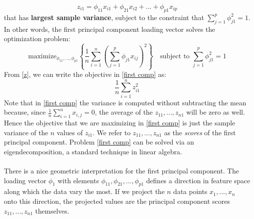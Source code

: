 \begin{equation}
    z_{i1} = \phi_{11}x_{i1} + \phi_{21}x_{i2} + ... +\phi_{p1}x_{ip}
    \label{z}
\end{equation}
that has \textbf{largest sample variance}, subject to the constraint that $\sum_{j=1}^p \phi_{j1}^2 = 1$. In other words, the first principal component loading vector solves the optimization problem:
\begin{equation}
    \text{maximize}_{\phi_{11}, ..., \phi_{p1}}\left\{\frac{1}{n}\sum_{i=1}^n\left(\sum_{j=1}^p \phi_{j1}x_{ij}\right)^2\right\} \quad \text{subject to } \sum_{j=1}^p \phi_{j1}^2 = 1
    \label{first comp}
\end{equation}
From \ref{z}, we can write the objective in \ref{first comp} as:
\[\frac{1}{n}\sum_{i=1}^n z_{i1}^2\]
Note that in \ref{first comp} the variance is computed without subtracting the mean because, since $\frac{1}{n}\sum_{i=1}^n x_{i,j} = 0$,  the average of the $z_{11},...,z_{n1}$ will be zero as well. Hence the objective that we are maximizing in \ref{first comp}  is just the sample variance of the $n$ values of $z_{i1}$. We refer to $z_{11},...,z_{n1}$ as the \textit{scores} of the first principal component. Problem \ref{first comp} can be solved via an eigendecomposition, a standard technique in linear algebra.\\\\
There is a nice geometric interpretation for the first principal component. The loading vector $\phi_1$ with elements $\phi_{11}, \phi_{21},...,\phi_{p1}$ defines a direction in feature space along which the data vary the most. If we project the $n$ data points $x_1,...,x_n$ onto this direction, the projected values are the principal component scores $z_{11},...,z_{n1}$ themselves. 

